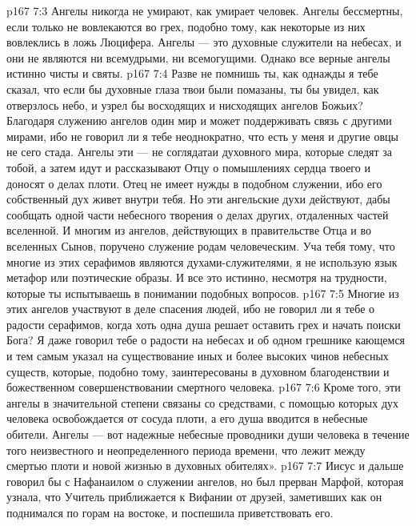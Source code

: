 \vs p167 7:3 Ангелы никогда не умирают, как умирает человек. Ангелы бессмертны, если только не вовлекаются во грех, подобно тому, как некоторые из них вовлеклись в ложь Люцифера. Ангелы --- это духовные служители на небесах, и они не являются ни всемудрыми, ни всемогущими. Однако все верные ангелы истинно чисты и святы.
\vs p167 7:4 Разве не помнишь ты, как однажды я тебе сказал, что если бы духовные глаза твои были помазаны, ты бы увидел, как отверзлось небо, и узрел бы восходящих и нисходящих ангелов Божьих? Благодаря служению ангелов один мир и может поддерживать связь с другими мирами, ибо не говорил ли я тебе неоднократно, что есть у меня и другие овцы не сего стада. Ангелы эти --- не соглядатаи духовного мира, которые следят за тобой, а затем идут и рассказывают Отцу о помышлениях сердца твоего и доносят о делах плоти. Отец не имеет нужды в подобном служении, ибо его собственный дух живет внутри тебя. Но эти ангельские духи действуют, дабы сообщать одной части небесного творения о делах других, отдаленных частей вселенной. И многим из ангелов, действующих в правительстве Отца и во вселенных Сынов, поручено служение родам человеческим. Уча тебя тому, что многие из этих серафимов являются духами\hyp{}служителями, я не использую язык метафор или поэтические образы. И все это истинно, несмотря на трудности, которые ты испытываешь в понимании подобных вопросов.
\vs p167 7:5 Многие из этих ангелов участвуют в деле спасения людей, ибо не говорил ли я тебе о радости серафимов, когда хоть одна душа решает оставить грех и начать поиски Бога? Я даже говорил тебе о радости  на небесах и об одном грешнике кающемся и тем самым указал на существование иных и более высоких чинов небесных существ, которые, подобно тому, заинтересованы в духовном благоденствии и божественном совершенствовании смертного человека.
\vs p167 7:6 Кроме того, эти ангелы в значительной степени связаны со средствами, с помощью которых дух человека освобождается от сосуда плоти, а его душа вводится в небесные обители. Ангелы --- вот надежные небесные проводники души человека в течение того неизвестного и неопределенного периода времени, что лежит между смертью плоти и новой жизнью в духовных обителях».
\vs p167 7:7 \pc Иисус и дальше говорил бы с Нафанаилом о служении ангелов, но был прерван Марфой, которая узнала, что Учитель приближается к Вифании от друзей, заметивших как он поднимался по горам на востоке, и поспешила приветствовать его.
